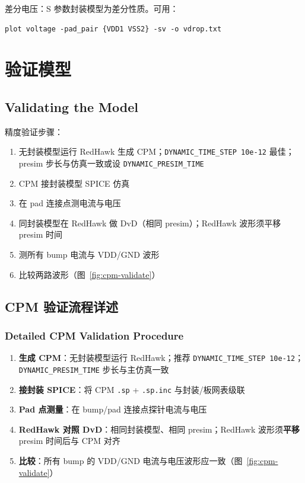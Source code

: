 差分电压：S 参数封装模型为差分性质。可用：
\begin{lstlisting}
plot voltage -pad_pair {VDD1 VSS2} -sv -o vdrop.txt
\end{lstlisting}

\section{验证模型}
\subsection*{Validating the Model}

精度验证步骤：
\begin{enumerate}
  \item 无封装模型运行 RedHawk 生成 CPM；\texttt{DYNAMIC\_TIME\_STEP 10e-12} 最佳；presim 步长与仿真一致或设 \texttt{DYNAMIC\_PRESIM\_TIME}
  \item CPM 接封装模型 SPICE 仿真
  \item 在 pad 连接点测电流与电压
  \item 同封装模型在 RedHawk 做 DvD（相同 presim）；RedHawk 波形须平移 presim 时间
  \item 测所有 bump 电流与 VDD/GND 波形
  \item 比较两路波形（图~\ref{fig:cpm-validate}）
\end{enumerate}

\subsection{CPM 验证流程详述}
\subsubsection*{Detailed CPM Validation Procedure}

\begin{enumerate}
  \item \textbf{生成 CPM}：无封装模型运行 RedHawk；推荐 \texttt{DYNAMIC\_TIME\_STEP 10e-12}；\texttt{DYNAMIC\_PRESIM\_TIME} 步长与主仿真一致
  \item \textbf{接封装 SPICE}：将 CPM \texttt{.sp} + \texttt{.sp.inc} 与封装/板网表级联
  \item \textbf{Pad 点测量}：在 bump/pad 连接点探针电流与电压
  \item \textbf{RedHawk 对照 DvD}：相同封装模型、相同 presim；RedHawk 波形须\textbf{平移} presim 时间后与 CPM 对齐
  \item \textbf{比较}：所有 bump 的 VDD/GND 电流与电压波形应一致（图~\ref{fig:cpm-validate}）
\end{enumerate}

